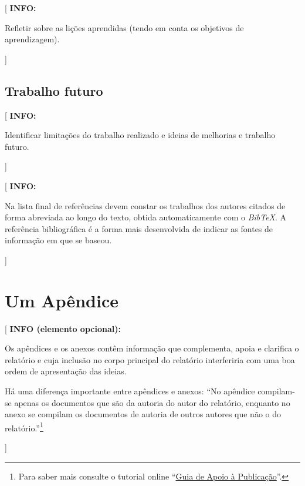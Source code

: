 \documentclass[11pt,a4paper]{report}
\newcommand{\class}[1]{{\normalfont\slshape #1\/}}
\newenvironment{info}[1]{\vspace*{6mm}\color{blue}[ \textbf{INFO:} \begin{em} #1}
                        {\vspace*{3mm}\end{em} ]}
\newenvironment{infoopt}[1]{\vspace*{6mm}\color{blue}[ \textbf{INFO (elemento opcional):} \begin{em} #1}
                        {\vspace*{3mm}\end{em} ]}
\begin{document}
\begin{info}
Refletir sobre as lições aprendidas (tendo em conta os objetivos de aprendizagem).
\end{info}

\lipsum[12]

\section{Trabalho futuro}

\begin{info}
Identificar limitações do trabalho realizado e ideias de melhorias e trabalho futuro.
\end{info}


\renewcommand{\bibname}{Referências bibliográficas}

%

\begin{info}
Na lista final de referências devem constar os trabalhos dos autores
citados de forma abreviada ao longo do texto, obtida automaticamente
com o \class{BibTeX}.
A referência bibliográfica é a forma mais desenvolvida de indicar as
fontes de informação em que se baseou. 
\end{info}


\appendix
\chapter{Um Apêndice}

\begin{infoopt}
Os apêndices e os anexos contêm informação que complementa, apoia e
clarifica o relatório e cuja inclusão no corpo principal do relatório
interferiria com uma boa ordem de apresentação das ideias.

Há uma diferença importante entre apêndices e anexos: ``No apêndice
compilam-se apenas os documentos que são da autoria do autor do
relatório, enquanto no anexo se compilam os documentos de autoria de
outros autores que não o do relatório.''\footnote{%
Para saber mais consulte o tutorial online 
``\href{https://docs.google.com/document/d/1TDC1behVq8x7fQL4CcPEEh_np5GXviJevQxnQ9gbiJs/edit}
{Guia de Apoio à Publicação}''.}
\end{infoopt}

\end{document}
